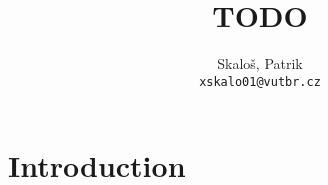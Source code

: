 \documentclass[a4paper]{article}
\title{TODO}
\author{
  Skaloš, Patrik\\
  \texttt{xskalo01@vutbr.cz}
}
\date{}
\begin{document}
  \maketitle

  \tableofcontents

  \newpage


  \section{Introduction}


  \newpage
  
  
\end{document}
